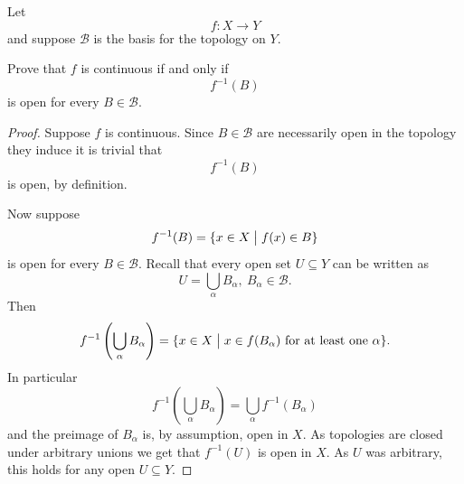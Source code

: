 \documentclass[11pt]{article}
\begin{document}
\begin{prob}
    Let 
    \[
        f : X \to Y
    \]
    and suppose $\mathcal B$ is the 
    basis for the topology on $Y$.

    Prove that $f$ is continuous if 
    and only if 
    \[
        f^{-1}(B)
    \]
    is open for every $B \in \mathcal B$.
\end{prob}
\begin{proof}
    Suppose $f$ is continuous. 
    Since $B \in \mathcal B$ are necessarily 
    open in the topology they induce it is trivial 
    that 
    \[
        f^{-1}(B)
    \]
    is open, by definition. 

    Now suppose 
    \[
        f^{-1}(B) = \{x \in X \bigm| f(x) \in B\}
    \]
    is open for every $B \in \mathcal B$. 
    Recall that every open set $U \subseteq Y$ can be 
    written as 
    \[
        U = \bigcup_{\alpha} B_\alpha, \ B_\alpha \in \mathcal B. 
    \]
    Then 
    \[
        f^{-1}\left(\bigcup_\alpha B_\alpha\right) 
        = \{x \in X \bigm| x \in f(B_\alpha) \ \text{for at least one} \ \alpha\}. 
    \]
    In particular 
    \[
        f^{-1}\left(\bigcup_\alpha B_\alpha\right)
        = \bigcup_\alpha f^{-1}\left(B_\alpha\right)
    \]
    and the preimage of $B_\alpha$ is, by assumption, 
    open in $X$. As topologies are closed under arbitrary 
    unions we get that $f^{-1}(U)$ is open in $X$. 
    As $U$ was arbitrary, this holds for any open $U \subseteq Y$. 

\end{proof}
\end{document}

